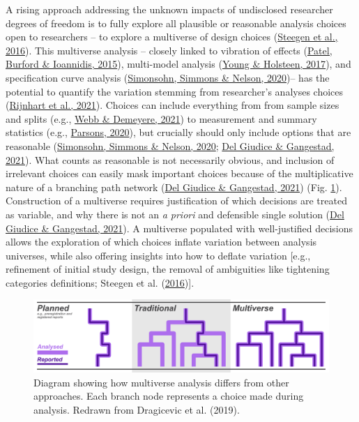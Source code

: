 \documentclass[10pt,a4paper]{article}
\begin{document}
A rising approach addressing the unknown impacts of undisclosed researcher degrees of freedom is to fully explore all plausible or reasonable analysis choices open to researchers -- to explore a multiverse of design choices (\protect\hyperlink{ref-steegen_increasing_2016}{Steegen et al., 2016}).
This multiverse analysis -- closely linked to vibration of effects (\protect\hyperlink{ref-patel_assessment_2015}{Patel, Burford \& Ioannidis, 2015}), multi-model analysis (\protect\hyperlink{ref-young_model_2017}{Young \& Holsteen, 2017}), and specification curve analysis (\protect\hyperlink{ref-simonsohn_specification_2020}{Simonsohn, Simmons \& Nelson, 2020})-- has the potential to quantify the variation stemming from researcher's analyses choices (\protect\hyperlink{ref-rijnhart_assessing_2021}{Rijnhart et al., 2021}).
Choices can include everything from from sample sizes and splits (e.g., \protect\hyperlink{ref-webb_multiverse_2021}{Webb \& Demeyere, 2021}) to measurement and summary statistics (e.g., \protect\hyperlink{ref-parsons_exploring_2020}{Parsons, 2020}), but crucially should only include options that are reasonable (\protect\hyperlink{ref-simonsohn_specification_2020}{Simonsohn, Simmons \& Nelson, 2020}; \protect\hyperlink{ref-del_giudice_travelers_2021}{Del Giudice \& Gangestad, 2021}).
What counts as reasonable is not necessarily obvious, and inclusion of irrelevant choices can easily mask important choices because of the multiplicative nature of a branching path network (\protect\hyperlink{ref-del_giudice_travelers_2021}{Del Giudice \& Gangestad, 2021}) (Fig. \ref{fig:multiDiagram}).
Construction of a multiverse requires justification of which decisions are treated as variable, and why there is not an \emph{a priori} and defensible single solution (\protect\hyperlink{ref-del_giudice_travelers_2021}{Del Giudice \& Gangestad, 2021}).
A multiverse populated with well-justified decisions allows the exploration of which choices inflate variation between analysis universes, while also offering insights into how to deflate variation {[}e.g., refinement of initial study design, the removal of ambiguities like tightening categories definitions; Steegen et al. (\protect\hyperlink{ref-steegen_increasing_2016}{2016}){]}.

\begin{figure}
\includegraphics[width=1\linewidth]{../ext_images/Multiverse compared diagram updated} \caption{Diagram showing how multiverse analysis differs from other approaches. Each branch node represents a choice made during analysis. Redrawn from Dragicevic et al. (2019).}\label{fig:multiDiagram}
\end{figure}
\end{document}
